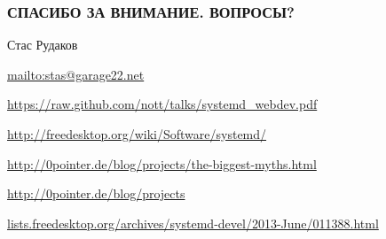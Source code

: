 \documentclass[aspectratio=169]{beamer}
\begin{document}
\begin{finalframe}
  \frametitle{СПАСИБО ЗА ВНИМАНИЕ. ВОПРОСЫ?}
    \begin{block}{Стас Рудаков}
    \par \url{mailto:stas@garage22.net}
    \par \url{https://raw.github.com/nott/talks/systemd_webdev.pdf}
    \end{block}

    \begin{block}
      \par \url{http://freedesktop.org/wiki/Software/systemd/}
      \par \url{http://0pointer.de/blog/projects/the-biggest-myths.html}
      \par \url{http://0pointer.de/blog/projects}
      \par \url{lists.freedesktop.org/archives/systemd-devel/2013-June/011388.html}
    \end{block}

\end{finalframe}
\end{document}
